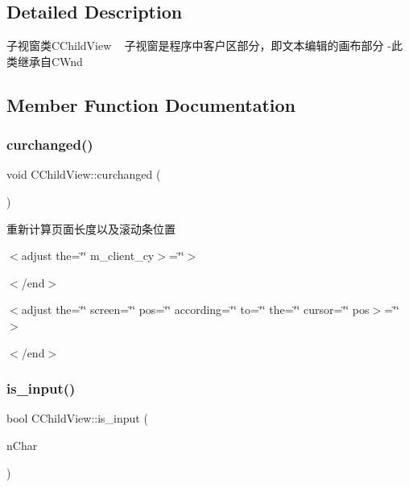 \subsection{Detailed Description}
子视窗类\+C\+Child\+View ~\newline
子视窗是程序中客户区部分，即文本编辑的画布部分 -\/此类继承自\+C\+Wnd 

\subsection{Member Function Documentation}
\mbox{\label{class_c_child_view_ab68bf2b03a8e9aab3f2aac2b9ec3177a}} 
\subsubsection{\texorpdfstring{curchanged()}{curchanged()}}
{\footnotesize\ttfamily void C\+Child\+View\+::curchanged (\begin{DoxyParamCaption}{ }\end{DoxyParamCaption})}



重新计算页面长度以及滚动条位置 

$<$adjust the=\char`\"{}\char`\"{} m\+\_\+client\+\_\+cy$>$=\char`\"{}\char`\"{}$>$

$<$/end$>$

$<$adjust the=\char`\"{}\char`\"{} screen=\char`\"{}\char`\"{} pos=\char`\"{}\char`\"{} according=\char`\"{}\char`\"{} to=\char`\"{}\char`\"{} the=\char`\"{}\char`\"{} cursor=\char`\"{}\char`\"{} pos$>$=\char`\"{}\char`\"{}$>$

$<$/end$>$ \mbox{\label{class_c_child_view_a32656902f423e5c809ca20f3013fc107}} 
\subsubsection{\texorpdfstring{is\+\_\+input()}{is\_input()}}
{\footnotesize\ttfamily bool C\+Child\+View\+::is\+\_\+input (\begin{DoxyParamCaption}\item[{U\+I\+NT}]{n\+Char }\end{DoxyParamCaption})\hspace{0.3cm}{\ttfamily [inline]}}



